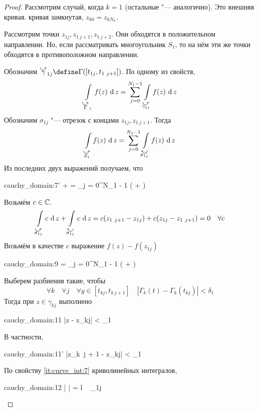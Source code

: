 \begin{proof}
	Рассмотрим случай, когда $ k = 1 $ (остальные "--- аналогично). Это внешняя кривая. \As кривая замкнутая, $ z_{k0} = z_{kN_k} $.

	Рассмотрим точки $ z_{1j}, z_{1~j + 1}, z_{1~j + 2} $. Они обходятся в положительном направлении. Но, если рассматривать многоугольник $ S_1 $, то на нём эти же точки обходятся в противоположном направлении.

	Обозначим $ \curvedir\gamma_{1j} \define \Gamma([t_{1j}, t_{1~j + 1}]) $. По одному из свойств,
	$$ \cint[z]{\curvedir\Gamma_1}{f(z)} = \sum_{j = 0}^{N_1 - 1} \cint[z]{\curvedir{\gamma_{1j}}}{f(z)} $$
	Обозначим $ \sigma_{1j} $ "--- отрезок с концами $ z_{1j}, z_{1~j + 1} $. Тогда
	$$ \cint[z]{\curvedir{S_1}}{f(z)} = \sum_{j = 0}^{N_1 - 1} \cint[z]{\curvedir[0]{\sigma_{1j}}}{f(z)} $$
	Из последних двух выражений получаем, что
	\begin{equ}{cauchy_domain:7'}
		 +  = \sum_{j = 0}^{N_1 - 1} \bigg(  +  \bigg)
	\end{equ}
	Возьмём $ c \in \mathbb{C} $.
	$$ \cint[z]{\curvedir{\sigma_{1j}}}c + \cint[z]{\curvedir[0]{\sigma_{1j}}}c = c(z_{1~j + 1} - z_{1j}) + c(z_{1j} - z_{1~j + 1}) = 0 \quad \forall c $$
	Возьмём в качестве $ c $ выражение $ f(z) - f(z_{1j}) $
	\begin{equ}{cauchy_domain:9}
		 = \sum_{j = 0}^{N_1 - 1} \bigg(  +  \bigg)
	\end{equ}
	Выберем разбиения такие, чтобы
	$$ \forall k \quad \forall j \quad \forall y \in [t_{kj}, t_{k~j + 1}] \quad |\Gamma_k(t) - \Gamma_k(t_{kj})| < \delta_1 $$
	Тогда при $ z \in \gamma_{kj} $ выполнено
	\begin{equ}{cauchy_domain:11}
		|z - z_{kj}| < \delta_1
	\end{equ}
	В частности,
	\begin{equ}{cauchy_domain:11'}
		|z_{k~j + 1} - z_{kj}| < \delta_1
	\end{equ}
	По свойству \ref{it:curve_int:7} криволинейных интегралов,
	\begin{equ}{cauchy_domain:12}
		\bigg|  \bigg| \le {} \le {}\eps = \eps \cdot l ~ \gamma_{1j}
	\end{equ}


\end{proof}
